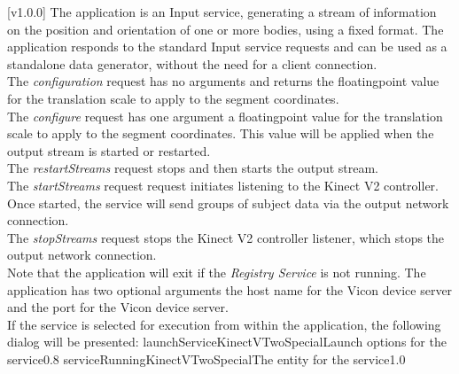 [v1.0.0]
The  application is an Input service,
generating a stream of information on the position and orientation of one or more bodies,
using a fixed format.
The application responds to the standard Input service requests and can be used as a
standalone data generator, without the need for a client connection.\\

The \emph{configuration} request has no arguments and returns the floating\longDash{}point
value for the translation scale to apply to the segment coordinates.\\

The \emph{configure} request has one argument \longDash{} a floating\longDash{}point
value for the translation scale to apply to the segment coordinates.
This value will be applied when the output stream is started or restarted.\\ 

The \emph{restartStreams} request stops and then starts the output stream.\\

The \emph{startStreams} request request initiates listening to the Kinect V2 controller.
Once started, the service will send groups of subject data via the output \yarp{} network
connection.\\

The \emph{stopStreams} request stops the Kinect V2 controller listener, which stops the
output \yarp{} network connection.\\ 

Note that the application will exit if the \emph{Registry Service} is not running.
The application has two optional arguments \longDash{} the host name for the Vicon device
server and the port for the Vicon device server.
\insertAppParameters
\condPage
\insertTagDescription{\KVtwoSI}
\insertInputServiceComment\\

\insertStandardServiceCommands
\secondaryEnd
{}
If the service is selected for execution from within the \emph{\MMMU} application, the
following dialog will be presented:
%
{launchServiceKinectVTwoSpecial}{Launch options for the \KVtwoSI{} service}{0.8}
\condPage
{}%
{serviceRunningKinectVTwoSpecial}{The \emph{\MMMU} entity for the \KVtwoSI{} service}{1.0}
\secondaryEnd
\primaryEnd{}
